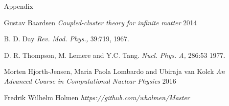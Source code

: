 \documentclass[twoside,english]{uiofysmaster}
\begin{document}
\begin{chapter}{Appendix}
	
\end{chapter}

\medskip


\begin{thebibliography}{9}

	Gustav Baardsen
	\textit{Coupled-cluster theory for infinite matter} 2014

	B. D. Day
	\textit{Rev. Mod. Phys.,}
	39:719, 1967.

	D. R. Thompson, M. Lemere and Y.C. Tang.
	\textit{Nucl. Phys. A,} 286:53 1977.

	Morten Hjorth-Jensen, Maria Paola Lombardo and Ubiraja van Kolck
	\textit{An Advanced Course in Computational Nuclear Physics} 2016

	Fredrik Wilhelm Holmen
	\textit{https://github.com/wholmen/Master} 

\end{thebibliography}
\end{document}
